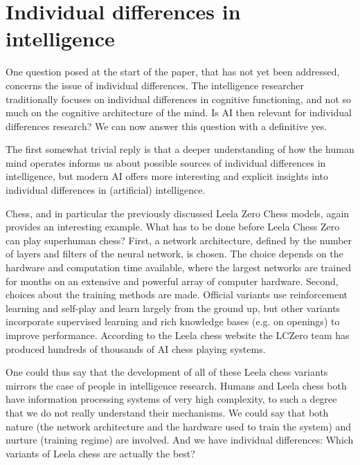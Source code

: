 \section{Individual differences in intelligence}

One question posed at the start of the paper, that has not yet been
addressed, concerns the issue of individual differences.
The intelligence researcher traditionally focuses on individual
differences in cognitive functioning, and not so much on the cognitive
architecture of the mind.
Is AI then relevant for individual differences research?
We can now answer this question with a definitive yes.

The first somewhat trivial reply is that a deeper understanding of
how the human mind operates informs us about possible sources of
individual differences in intelligence, but modern AI offers more
interesting and explicit insights into individual differences in
(artificial) intelligence.

Chess, and in particular the previously discussed Leela Zero Chess
models, again provides an interesting example.
What has to be done before Leela Chess Zero can play superhuman chess?
First, a network architecture, defined by the number of layers and
filters of the neural network, is chosen.
The choice depends on the hardware and computation time available,
where the largest networks are trained for months on an extensive
and powerful array of computer hardware.
Second, choices about the training methods are made.
Official variants use reinforcement learning and self-play and learn
largely from the ground up, but other variants incorporate supervised
learning and rich knowledge bases (e.g. on openings) to improve
performance.
According to the Leela chess website the LCZero team has produced
hundreds of thousands of AI chess playing systems.

One could thus say that the development of all of these Leela chess
variants mirrors the case of people in intelligence research.
Humans and Leela chess both have information processing systems
of very high complexity, to such a degree that we do not really
understand their mechanisms.
We could say that both nature (the network architecture and the
hardware used to train the system) and nurture (training regime)
are involved.
And we have individual differences: Which variants of Leela chess
are actually the best?

